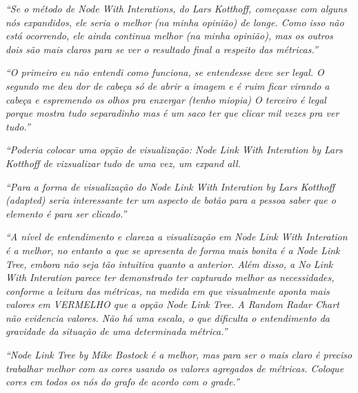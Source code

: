 \begin{apendicesenv}
\textit{``Se o método de Node With Interations, do Lars Kotthoff, começasse com
alguns nós expandidos, ele seria o melhor (na minha opinião) de longe. Como
isso não está ocorrendo, ele ainda continua melhor (na minha opinião), mas os
outros dois são mais claros para se ver o resultado final a respeito das
métricas.''}

\textit{``O primeiro eu não entendi como funciona, se entendesse deve ser legal. O
segundo me deu dor de cabeça só de abrir a imagem e é ruim ficar virando a
cabeça e espremendo os olhos pra enxergar (tenho miopia)  O terceiro é legal
porque mostra tudo separadinho mas é um saco ter que clicar mil vezes pra ver
tudo.''}

\textit{``Poderia colocar uma opção de visualização: Node Link With Interation
by Lars Kotthoff de vizsualizar tudo de uma vez, um expand all.}

\textit{``Para a forma de visualização do Node Link With Interation by Lars
Kotthoff (adapted) seria interessante ter um aspecto de botão para a pessoa
saber que o elemento é para ser clicado.''}

\textit{``A nível de entendimento e clareza a visualização em Node Link With
Interation é a melhor, no entanto a que se apresenta de forma mais bonita é a
Node Link Tree, embora não seja tão intuitiva quanto a anterior. Além disso, a
No Link With Interation parece ter demonstrado ter capturado melhor as
necessidades, conforme a leitura das métricas, na medida em que visualmente
aponta mais valores em VERMELHO que a opção Node Link Tree. A Random Radar
Chart não evidencia valores. Não há uma escala, o que dificulta
o entendimento da gravidade da situação de uma determinada métrica.''}

\textit{``Node Link Tree by Mike Bostock é a melhor, mas para ser o mais claro é
preciso trabalhar melhor com as cores usando os valores agregados de métricas.
Coloque cores em todos os nós do grafo de acordo com o grade.''}

\end{apendicesenv}
